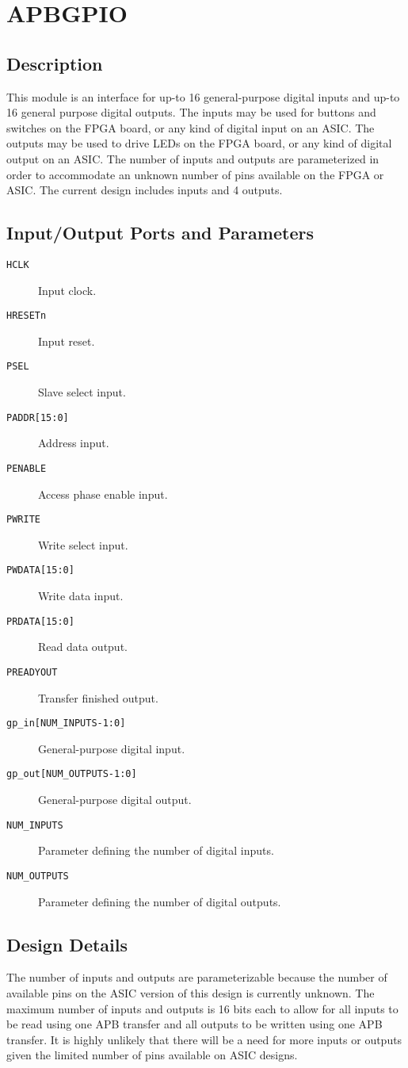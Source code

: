 \section{APBGPIO} \label{gpio}
\subsection{Description}
This module is an interface for up-to 16 general-purpose digital inputs and up-to 16 general purpose digital outputs. The inputs may be used for buttons and switches on the FPGA board, or any kind of digital input on an ASIC. The outputs may be used to drive LEDs on the FPGA board, or any kind of digital output on an ASIC. The number of inputs and outputs are parameterized in order to accommodate an unknown number of pins available on the FPGA or ASIC. The current design includes inputs and 4 outputs.

\subsection{Input/Output Ports and Parameters}
\begin{description}
	\item[\texttt{HCLK}] Input clock.
	\item[\texttt{HRESETn}] Input reset.
	\item[\texttt{PSEL}] Slave select input.
	\item[\texttt{PADDR[15:0]}] Address input.
	\item[\texttt{PENABLE}] Access phase enable input.
	\item[\texttt{PWRITE}] Write select input.
	\item[\texttt{PWDATA[15:0]}] Write data input.
	\item[\texttt{PRDATA[15:0]}] Read data output.
	\item[\texttt{PREADYOUT}] Transfer finished output.
	\item[\texttt{gp\_in[NUM\_INPUTS-1:0]}] General-purpose digital input.
	\item[\texttt{gp\_out[NUM\_OUTPUTS-1:0]}] General-purpose digital output.
	\item[\texttt{NUM\_INPUTS}] Parameter defining the number of digital inputs.
	\item[\texttt{NUM\_OUTPUTS}] Parameter defining the number of digital outputs. 
\end{description}

\subsection{Design Details}
The number of inputs and outputs are parameterizable because the number of available pins on the ASIC version of this design is currently unknown. The maximum number of inputs and outputs is 16 bits each to allow for all inputs to be read using one APB transfer and all outputs to be written using one APB transfer. It is highly unlikely that there will be a need for more inputs or outputs given the limited number of pins available on ASIC designs.

